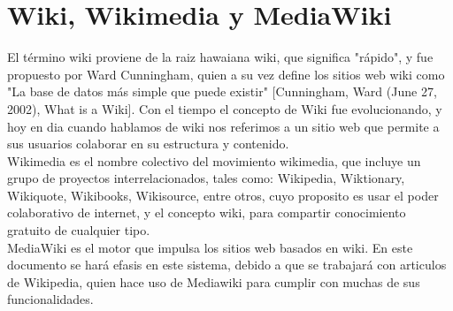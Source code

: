 \section{Wiki, Wikimedia y MediaWiki}

El término wiki proviene de la raiz hawaiana wiki, que significa "rápido", y fue propuesto por Ward Cunningham, quien a su vez define los sitios web wiki como "La base de datos más simple que puede existir" [Cunningham, Ward (June 27, 2002), What is a Wiki]. Con el tiempo el concepto de Wiki fue evolucionando, y hoy en dia cuando hablamos de wiki nos referimos a un sitio web que permite a sus usuarios colaborar en su estructura y contenido.\\

Wikimedia es el nombre colectivo del movimiento wikimedia, que incluye un grupo de proyectos interrelacionados, tales como: Wikipedia, Wiktionary, Wikiquote, Wikibooks, Wikisource, entre otros, cuyo proposito es usar el poder colaborativo de internet, y el concepto wiki, para compartir conocimiento gratuito de cualquier tipo.\\

MediaWiki es el motor que impulsa los sitios web basados en wiki. En este documento se hará efasis en este sistema, debido a que se trabajará con articulos de Wikipedia, quien hace uso de Mediawiki para cumplir con muchas de sus funcionalidades.






